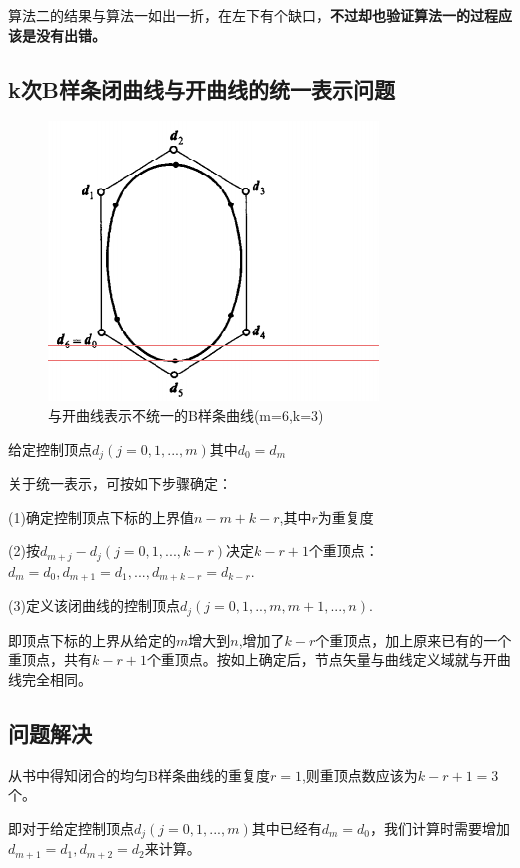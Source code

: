 \documentclass[12pt,a4paper]{article}
\begin{document}
算法二的结果与算法一如出一折，在左下有个缺口，{\bfseries 不过却也验证算法一的过程应该是没有出错。}


{\bfseries {}}

\subsection{k次B样条闭曲线与开曲线的统一表示问题}
\begin{figure}[ht]
	\centering
	\includegraphics[scale=0.4]{./figures/1.png}
	\caption{与开曲线表示不统一的B样条曲线(m=6,k=3)}
	\label{fig:label}	
\end{figure}

给定控制顶点$d_j(j=0,1,...,m)$其中$d_0 = d_m$

关于统一表示，可按如下步骤确定：

(1)确定控制顶点下标的上界值$n-m+k-r$,其中$r$为重复度

(2)按$d_{m+j}-d_j$$(j=0,1,...,k-r)$决定$k-r+1$个重顶点：$d_m=d_0,d_{m+1}=d_1,...,d_{m+k-r}=d_{k-r}$.

(3)定义该闭曲线的控制顶点$d_j(j=0,1,..,m,m+1,...,n)$.

即顶点下标的上界从给定的$m$增大到$n$,增加了$k-r$个重顶点，加上原来已有的一个重顶点，共有$k-r+1$个重顶点。按如上确定后，节点矢量与曲线定义域就与开曲线完全相同。


\subsection{问题解决}
从书中得知闭合的均匀B样条曲线的重复度$r=1$,则重顶点数应该为$k-r+1=3$个。

即对于给定控制顶点$d_j(j=0,1,...,m)$其中已经有$d_m=d_0$，我们计算时需要增加$d_{m+1}=d_1,d_{m+2}=d_{2}$来计算。
\end{document}
